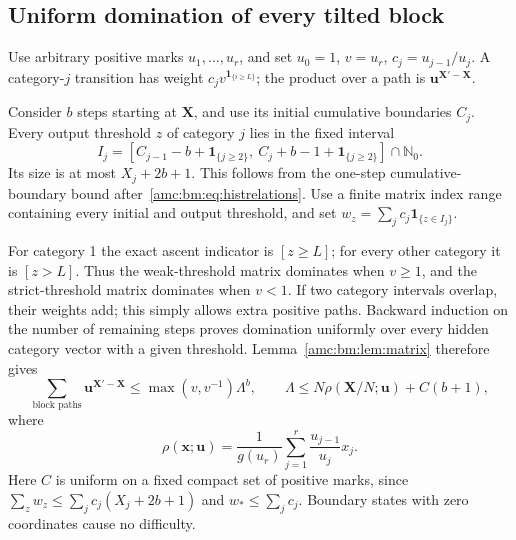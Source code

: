 \documentclass[11pt,letterpaper]{article}
\theoremstyle{remark}\newtheorem{remark}[theorem]{Remark}
\newcommand{\ind}[1]{\mathbf1_{\{#1\}}}
\newcommand{\N}{\mathbb N}
\newcommand{\bX}{\boldsymbol X}
\newcommand{\bu}{\boldsymbol u}
\newcommand{\bx}{\boldsymbol x}
\begin{document}
\subsection{Uniform domination of every tilted block}
Use arbitrary positive marks $u_1,\ldots,u_r$, and set $u_0=1$, $v=u_r$, $c_j=u_{j-1}/u_j$. A category-$j$ transition has weight $c_jv^{\ind{i\ge L}}$; the product over a path is $\bu^{\bX'-\bX}$.

Consider $b$ steps starting at $\bX$, and use its initial cumulative boundaries $C_j$. Every output threshold $z$ of category $j$ lies in the fixed interval
\[
 I_j=[C_{j-1}-b+\ind{j\ge2},\ C_j+b-1+\ind{j\ge2}]\cap\N_0.
\]
Its size is at most $X_j+2b+1$. This follows from the one-step cumulative-boundary bound after~\eqref{amc:bm:eq:histrelations}. Use a finite matrix index range containing every initial and output threshold, and set $w_z=\sum_j c_j\ind{z\in I_j}$.

For category 1 the exact ascent indicator is $[z\ge L]$; for every other category it is $[z>L]$. Thus the weak-threshold matrix dominates when $v\ge1$, and the strict-threshold matrix dominates when $v<1$. If two category intervals overlap, their weights add; this simply allows extra positive paths. Backward induction on the number of remaining steps proves domination uniformly over every hidden category vector with a given threshold. Lemma~\ref{amc:bm:lem:matrix} therefore gives
\begin{equation}\label{amc:bm:eq:blockupper}
 \sum_{\text{block paths}}\bu^{\bX'-\bX}
 \le\max(v,v^{-1})\Lambda^b,
 \qquad \Lambda\le N\rho(\bX/N;\bu)+C(b+1),
\end{equation}
where
\begin{equation}\label{amc:bm:eq:symbol}
 \rho(\bx;\bu)=\frac1{g(u_r)}\sum_{j=1}^r\frac{u_{j-1}}{u_j}x_j.
\end{equation}
Here $C$ is uniform on a fixed compact set of positive marks, since $\sum_z w_z\le\sum_jc_j(X_j+2b+1)$ and $w_*\le\sum_jc_j$. Boundary states with zero coordinates cause no difficulty.
\end{document}
